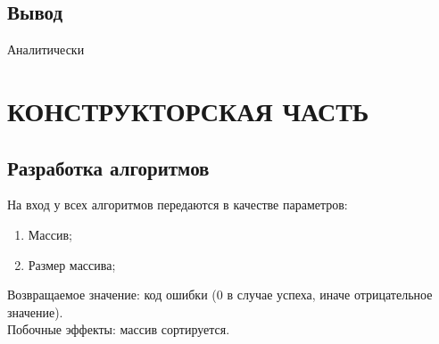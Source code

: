 \documentclass[a4paper,12pt]{article}
\begin{document}
\newpage
\subsection{Вывод}
Аналитически 


\newpage
\section{КОНСТРУКТОРСКАЯ ЧАСТЬ}

\subsection{Разработка алгоритмов}
На вход у всех алгоритмов передаются в качестве параметров:
\begin{enumerate}
\item Массив;
\item Размер массива;
\end{enumerate}
Возвращаемое значение: код ошибки (0 в случае успеха, иначе отрицательное значение). \\
Побочные эффекты: массив сортируется.

\newpage
\end{document}
